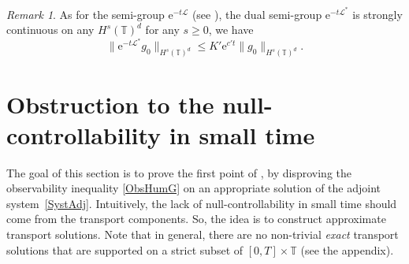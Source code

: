 \documentclass[JEP,XML,SOM,Unicode,NoEqCountersInSection]{cedram}
\let\mathcal\mathscr
\theoremstyle{plain}
\theoremstyle{definition}
\theoremstyle{remark}
\newtheorem{remark}[theorem]{Remark}
\newcommand{\set}{\mathbb}
\newcommand{\T}{\set{T}}
\newcommand{\eu}{\mathrm e}
\begin{document}
\begin{remark}\label{rk:semigroup*_Hs}
As for the semi-group $\eu^{-t\mathcal L}$ (see ), the dual semi-group $\eu^{-t\mathcal L^*}$ is strongly continuous on any $H^s(\T)^d$ for any $s\geq 0$, \ie we have
\[
\|\eu^{-t\mathcal L^*} g_0\|_{H^s(\T)^d} \leq K'\eu^{c' t}\|g_0\|_{H^s(\T)^d}.
\]
\end{remark}

\section{Obstruction to the null-controllability in small time} \label{Sec:Obst}

The goal of this section is to prove the first point of , by disproving the observability inequality \eqref{ObsHumG} on an appropriate solution of the adjoint system~\eqref{SystAdj}. Intuitively, the lack of null-controllability in small time should come from the transport components. So, the idea is to construct approximate transport solutions. Note that in general, there are no non-trivial \emph{exact} transport solutions that are supported on a strict subset of $[0,T]\times \set T$ (see the appendix).
\end{document}
